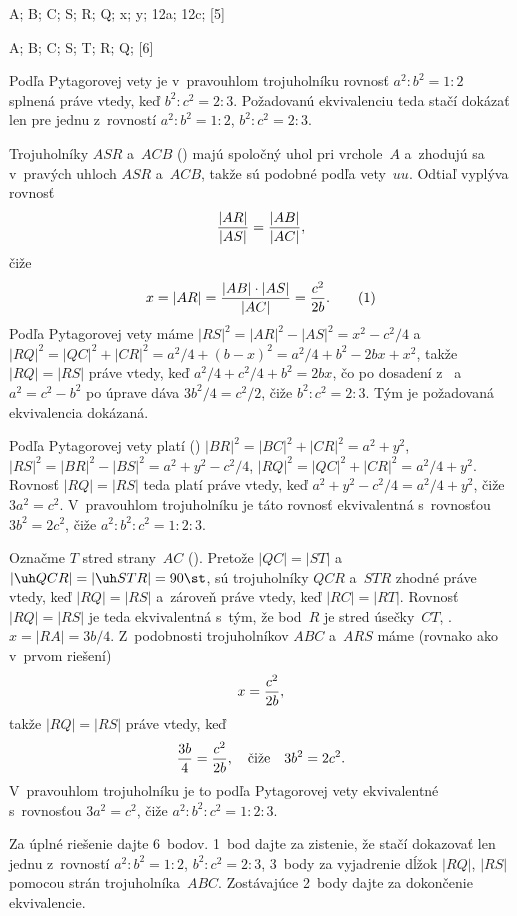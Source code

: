 {%
\fontplace
\tpoint A; \rpoint B; \rtpoint C;
\lBpoint S; \tpoint R; \rpoint Q;
\tpoint x; \tpoint y;
\rpoint\frac12a; \lBpoint\frac12c;
[5] \hfil\Obr

\fontplace
\tpoint A; \rpoint B; \rtpoint C;
\lBpoint S; \tpoint T; \tpoint R; \rpoint Q;
[6] \hfil\Obr

Podľa Pytagorovej vety je v~pravouhlom trojuholníku rovnosť
$a^2:b^2=1:2$ splnená práve vtedy, keď $b^2:c^2=2:3$. Požadovanú
ekvivalenciu teda stačí dokázať len pre jednu z~rovností
$a^2:b^2=1:2$, $b^2:c^2=2:3$.

\inspicture
Trojuholníky $ASR$ a~$ACB$ (\obr) majú spoločný uhol pri vrchole~$A$
a~zhodujú sa v~pravých uhloch $ASR$ a~$ACB$, takže sú
podobné podľa vety~$uu$. Odtiaľ vyplýva rovnosť
$$
{|AR|\over|AS|}={|AB|\over|AC|},
$$
čiže
$$
x=|AR|={|AB|\cdot|AS|\over|AC|}={c^2\over2b}.    \tag1
$$
Podľa Pytagorovej vety máme $|RS|^2=|AR|^2-|AS|^2=x^2-c^2/4$
a~$|RQ|^2=|QC|^2+|CR|^2=a^2/4+(b-x)^2=a^2/4+b^2-2bx+x^2$,
takže $|RQ|=|RS|$ práve vtedy, keď $a^2/4+c^2/4+b^2=2bx$,
čo po dosadení z~ a~$a^2=c^2-b^2$ po úprave dáva
$3b^2/4=c^2/2$, čiže $b^2:c^2=2:3$. Tým je požadovaná
ekvivalencia dokázaná.

\ineriesenie
Podľa Pytagorovej vety platí ()
$|BR|^2=|BC|^2+|CR|^2=a^2+y^2$,
$|RS|^2=|BR|^2-|BS|^2=a^2+y^2-c^2/4$,
$|RQ|^2=|QC|^2+|CR|^2=a^2/4+y^2$. Rovnosť $|RQ|=|RS|$ teda
platí práve vtedy, keď $a^2+y^2-c^2/4=a^2/4+y^2$, čiže
$3a^2=c^2$. V~pravouhlom trojuholníku je táto rovnosť ekvivalentná
s~rovnosťou $3b^2=2c^2$, čiže $a^2:b^2:c^2=1:2:3$.

\ineriesenie
Označme $T$ stred strany~$AC$ (\obr).
Pretože $|QC|=|ST|$ a~$|\uh QCR|=|\uh STR|=90\st$, sú trojuholníky $QCR$ a~$STR$ zhodné práve vtedy, keď
$|RQ|=|RS|$ a~zároveň práve vtedy, keď $|RC|=|RT|$. Rovnosť $|RQ|=|RS|$
je teda ekvivalentná s~tým, že bod~$R$ je stred úsečky~$CT$, \tj. $x=|RA|=3b/4$.
\inspicture
Z~podobnosti trojuholníkov $ABC$ a~$ARS$ máme
(rovnako ako v~prvom riešení)
$$
x={c^2\over2b},
$$
takže $|RQ|=|RS|$ práve vtedy, keď
$$
{3b\over4}={c^2\over2b}, \quad\text{čiže}\quad 3b^2=2c^2.
$$
V~pravouhlom trojuholníku je to podľa Pytagorovej vety ekvivalentné
s~rovnosťou $3a^2=c^2$, čiže $a^2:b^2:c^2=1:2:3$.

\nobreak\medskip\petit\noindent
Za úplné riešenie dajte 6~bodov. 1~bod dajte za zistenie, že stačí
dokazovať len jednu z~rovností $a^2:b^2=1:2$, $b^2:c^2=2:3$,
3~body za vyjadrenie dĺžok $|RQ|$, $|RS|$ pomocou strán trojuholníka~$ABC$.
Zostávajúce 2~body dajte za dokončenie ekvivalencie.

\endpetit
\bigbreak}

